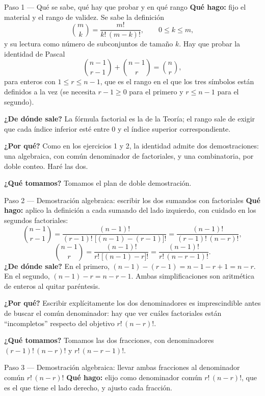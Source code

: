 \documentclass[11pt]{article}
\begin{document}
\begin{sol}
\begin{paso}{Paso 1 --- Qué se sabe, qué hay que probar y en qué rango}
\textbf{Qué hago:} fijo el material y el rango de validez. Se sabe la definición
\[
\binom{m}{k}=\frac{m!}{k!\,(m-k)!},\qquad 0\le k\le m,
\]
y su lectura como número de subconjuntos de tamaño $k$. Hay que probar la identidad de Pascal
\[
\binom{n-1}{r-1}+\binom{n-1}{r}=\binom{n}{r},
\]
para enteros con $1\le r\le n-1$, que es el rango en el que los tres símbolos están definidos
a la vez (se necesita $r-1\ge 0$ para el primero y $r\le n-1$ para el segundo).

\textbf{¿De dónde sale?} La fórmula factorial es la de la Teoría; el rango sale de exigir que
cada índice inferior esté entre $0$ y el índice superior correspondiente.

\textbf{¿Por qué?} Como en los ejercicios 1 y 2, la identidad admite dos demostraciones: una
algebraica, con común denominador de factoriales, y una combinatoria, por doble conteo. Haré
las dos.

\textbf{¿Qué tomamos?} Tomamos el plan de doble demostración.
\end{paso}

\begin{paso}{Paso 2 --- Demostración algebraica: escribir los dos sumandos con factoriales}
\textbf{Qué hago:} aplico la definición a cada sumando del lado izquierdo, con cuidado en los
segundos factoriales:
\[
\binom{n-1}{r-1}=\frac{(n-1)!}{(r-1)!\;\bigl[(n-1)-(r-1)\bigr]!}
=\frac{(n-1)!}{(r-1)!\,(n-r)!},
\]
\[
\binom{n-1}{r}=\frac{(n-1)!}{r!\;\bigl[(n-1)-r\bigr]!}=\frac{(n-1)!}{r!\,(n-r-1)!}.
\]
\textbf{¿De dónde sale?} En el primero, $(n-1)-(r-1)=n-1-r+1=n-r$. En el segundo,
$(n-1)-r=n-r-1$. Ambas simplificaciones son aritmética de enteros al quitar paréntesis.

\textbf{¿Por qué?} Escribir explícitamente los dos denominadores es imprescindible antes de
buscar el común denominador: hay que ver cuáles factoriales están ``incompletos'' respecto del
objetivo $r!\,(n-r)!$.

\textbf{¿Qué tomamos?} Tomamos las dos fracciones, con denominadores $(r-1)!\,(n-r)!$ y
$r!\,(n-r-1)!$.
\end{paso}

\begin{paso}{Paso 3 --- Demostración algebraica: llevar ambas fracciones al denominador común $r!\,(n-r)!$}
\textbf{Qué hago:} elijo como denominador común $r!\,(n-r)!$, que es el que tiene el lado
derecho, y ajusto cada fracción.


\end{paso}
\end{sol}
\end{document}
